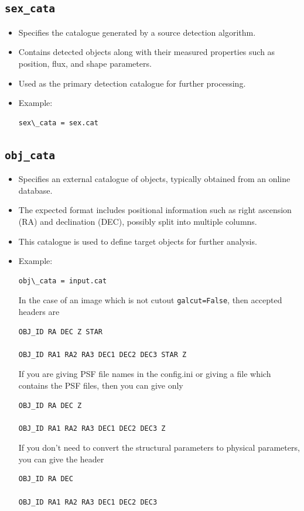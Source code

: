 \documentclass[11pt]{article}
\begin{document}
\subsection{\texttt{sex\_cata}}
\begin{itemize}
\item Specifies the catalogue generated by a source detection algorithm.
\item Contains detected objects along with their measured properties such as position, flux, and shape parameters.
\item Used as the primary detection catalogue for further processing.
\item Example:
\begin{verbatim}
sex\_cata = sex.cat
\end{verbatim}
\end{itemize}

\subsection{\texttt{obj\_cata}}
\begin{itemize}
\item Specifies an external catalogue of objects, typically obtained from an online database.
\item The expected format includes positional information such as right ascension (RA) and declination (DEC), possibly split into multiple columns.
\item This catalogue is used to define target objects for further analysis.
\item Example:
\begin{verbatim}
obj\_cata = input.cat
\end{verbatim}

In the case of an image which is not cutout \verb|galcut=False|, then accepted headers are
\begin{verbatim}
OBJ_ID RA DEC Z STAR 

OBJ_ID RA1 RA2 RA3 DEC1 DEC2 DEC3 STAR Z 
\end{verbatim}
If you are giving PSF file names in the config.ini or giving a file which contains the PSF files, then you can give only

\begin{verbatim}
OBJ_ID RA DEC Z 

OBJ_ID RA1 RA2 RA3 DEC1 DEC2 DEC3 Z
\end{verbatim}

If you don't need to convert the structural parameters to physical parameters, you can give the header

\begin{verbatim}
OBJ_ID RA DEC 

OBJ_ID RA1 RA2 RA3 DEC1 DEC2 DEC3 
\end{verbatim}


\end{itemize}
\end{document}

